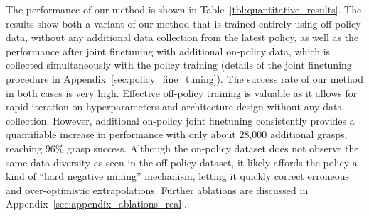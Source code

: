 \documentclass{article}
\begin{document}
\begin{table}[t]
\caption{Quantitative results in terms of grasp success rate on test objects. Policies are evaluated with object replacement (test) and without (bin emptying), with the latter showing success rates on the first 10, 20, and 30 grasps. The variant of our method that uses on-policy joint finetuning has a failure rate more than four times lower than prior work on the test set, while using substantially fewer grasp attempts for training. The variant that only uses off-policy training also substantially exceeds the performance of the prior method.
\label{tbl:quantitative_results}
\vspace{-0.3in}
}
\end{table}


The performance of our method is shown in Table~\ref{tbl:quantitative_results}. The results show both a variant of our method that is trained entirely using off-policy data, without any additional data collection from the latest policy, as well as the performance after joint finetuning with additional on-policy data, which is collected simultaneously with the policy training (details of the joint finetuning procedure in Appendix~\ref{sec:policy_fine_tuning}). The success rate of our method in both cases is very high. Effective off-policy training is valuable as it allows for rapid iteration on hyperparameters and architecture design without any data collection. However, additional on-policy joint finetuning consistently provides a quantifiable increase in performance with only about 28,000 additional grasps, reaching 96\% grasp success.
    Although the on-policy dataset does not observe the same data diversity as seen in the off-policy dataset, it likely affords the policy a kind of ``hard negative mining'' mechanism, letting it quickly correct erroneous and over-optimistic extrapolations. Further ablations are discussed in Appendix~\ref{sec:appendix_ablations_real}.
\end{document}
